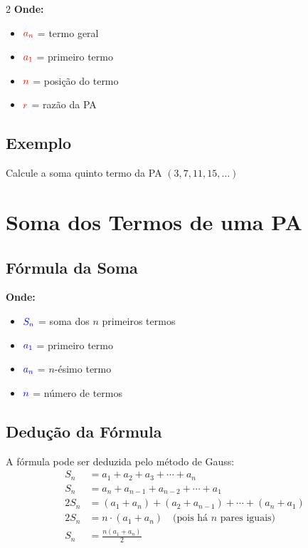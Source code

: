 \documentclass[11pt]{article}
\begin{document}
\begin{multicols}{2}
\textbf{Onde:}
\begin{itemize}
\item $\textcolor{red}{a_n}$ = termo geral
\item $\textcolor{red}{a_1}$ = primeiro termo
\item $\textcolor{red}{n}$ = posição do termo
\item $\textcolor{red}{r}$ = razão da PA
\end{itemize}

\subsection*{Exemplo}

Calcule a soma quinto termo da PA $(3, 7, 11, 15, \ldots)$
\section*{Soma dos Termos de uma PA}

\subsection*{Fórmula da Soma}


\vspace{5mm}

\textbf{Onde:}
\begin{itemize}
\item $\textcolor{blue}{S_n}$ = soma dos $n$ primeiros termos
\item $\textcolor{blue}{a_1}$ = primeiro termo
\item $\textcolor{blue}{a_n}$ = $n$-ésimo termo
\item $\textcolor{blue}{n}$ = número de termos
\end{itemize}

\subsection*{Dedução da Fórmula}

A fórmula pode ser deduzida pelo método de Gauss:
\begin{align*}
S_n &= a_1 + a_2 + a_3 + \cdots + a_n \\
S_n &= a_n + a_{n-1} + a_{n-2} + \cdots + a_1 \\
\hline
2S_n &= (a_1+a_n) + (a_2+a_{n-1}) + \cdots + (a_n+a_1) \\
2S_n &= n \cdot (a_1 + a_n) \quad \text{(pois há $n$ pares iguais)} \\
S_n &= \frac{n(a_1 + a_n)}{2}
\end{align*}


\end{multicols}
\end{document}
